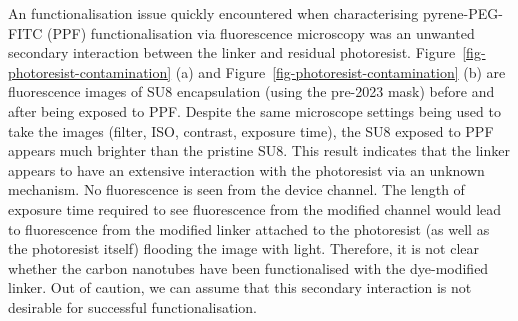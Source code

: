 \documentclass[
  a4paper,
]{scrbook}
\begin{document}
An functionalisation issue quickly encountered when characterising
pyrene-PEG-FITC (PPF) functionalisation via fluorescence microscopy was
an unwanted secondary interaction between the linker and residual
photoresist. Figure~\ref{fig-photoresist-contamination} (a) and
Figure~\ref{fig-photoresist-contamination} (b) are fluorescence images
of SU8 encapsulation (using the pre-2023 mask) before and after being
exposed to PPF. Despite the same microscope settings being used to take
the images (filter, ISO, contrast, exposure time), the SU8 exposed to
PPF appears much brighter than the pristine SU8. This result indicates
that the linker appears to have an extensive interaction with the
photoresist via an unknown mechanism. No fluorescence is seen from the
device channel. The length of exposure time required to see fluorescence
from the modified channel would lead to fluorescence from the modified
linker attached to the photoresist (as well as the photoresist itself)
flooding the image with light. Therefore, it is not clear whether the
carbon nanotubes have been functionalised with the dye-modified linker.
Out of caution, we can assume that this secondary interaction is not
desirable for successful functionalisation.
\end{document}

